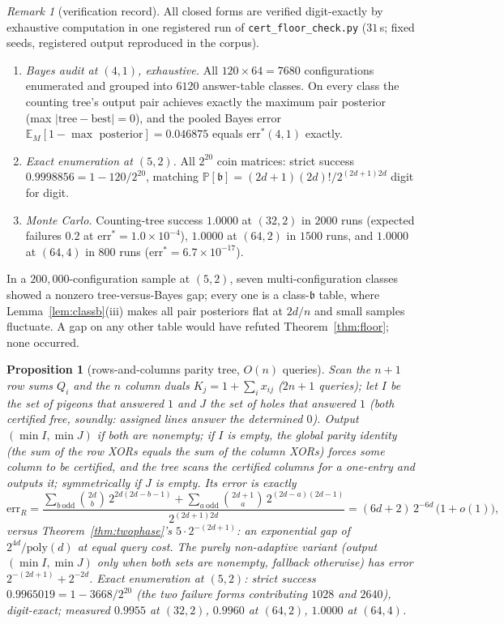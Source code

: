 \documentclass[11pt]{article}
\newtheorem{proposition}[theorem]{Proposition}
\theoremstyle{definition}
\theoremstyle{remark}
\newtheorem{remark}[theorem]{Remark}
\newcommand{\Prob}{\mathbb{P}}
\begin{document}
\begin{remark}[verification record]\label{rem:floorverify}
All closed forms are verified digit-exactly by exhaustive computation
in one registered run of \texttt{cert\_floor\_check.py} ($31$\,s; fixed
seeds, registered output reproduced in the corpus).
\begin{enumerate}
\item \emph{Bayes audit at $(4,1)$, exhaustive.}  All
$120\times64=7680$ configurations enumerated and grouped into $6120$
answer-table classes.  On every class the counting tree's output pair
achieves exactly the maximum pair posterior (max
$\lvert\text{tree}-\text{best}\rvert=0$), and the pooled Bayes error
$\mathbb{E}_M[1-\max\text{ posterior}]=0.046875$ equals
$\mathrm{err}^*(4,1)$ exactly.
\item \emph{Exact enumeration at $(5,2)$.}  All $2^{20}$ coin
matrices: strict success $0.9998856=1-120/2^{20}$, matching
$\Prob[\mathfrak{b}]=(2d+1)(2d)!/2^{(2d+1)2d}$ digit for digit.
\item \emph{Monte Carlo.}  Counting-tree success $1.0000$ at $(32,2)$
in $2000$ runs (expected failures $0.2$ at
$\mathrm{err}^*=1.0\times10^{-4}$), $1.0000$ at $(64,2)$ in $1500$
runs, and $1.0000$ at $(64,4)$ in $800$ runs
($\mathrm{err}^*=6.7\times10^{-17}$).
\end{enumerate}
In a $200{,}000$-configuration sample at $(5,2)$, seven
multi-configuration classes showed a nonzero tree-versus-Bayes gap;
every one is a class-$\mathfrak{b}$ table, where
Lemma~\ref{lem:classb}(iii) makes all pair posteriors flat at $2d/n$
and small samples fluctuate.  A gap on any other table would have
refuted Theorem~\ref{thm:floor}; none occurred.
\end{remark}

\begin{proposition}[rows-and-columns parity tree, $O(n)$ queries]
\label{prop:rcparity}
Scan the $n+1$ row sums $Q_i$ and the $n$ column duals
$K_j=1+\sum_ix_{ij}$ ($2n+1$ queries); let $I$ be the set of pigeons
that answered $1$ and $J$ the set of holes that answered $1$ (both
certified free, soundly: assigned lines answer the determined $0$).
Output $(\min I,\min J)$ if both are nonempty; if $I$ is empty, the
global parity identity (the sum of the row XORs equals the sum of the
column XORs) forces some column to be certified, and the tree scans
the certified columns for a one-entry and outputs it; symmetrically if
$J$ is empty.  Its error is exactly
\[
\mathrm{err}_{R}
=\frac{\displaystyle\sum_{b\ \mathrm{odd}}\binom{2d}{b}\,
2^{2d(2d-b-1)}
+\sum_{a\ \mathrm{odd}}\binom{2d+1}{a}\,
2^{(2d-a)(2d-1)}}{2^{(2d+1)2d}}
=(6d+2)\,2^{-6d}\,\bigl(1+o(1)\bigr),
\]
versus Theorem~\ref{thm:twophase}'s $5\cdot 2^{-(2d+1)}$: an
exponential gap of $2^{4d}/\mathrm{poly}(d)$ at equal query cost.  The
purely non-adaptive variant (output $(\min I,\min J)$ only when both
sets are nonempty, fallback otherwise) has error $2^{-(2d+1)}+2^{-2d}$.
Exact enumeration at $(5,2)$: strict success
$0.9965019=1-3668/2^{20}$ (the two failure forms contributing $1028$
and $2640$), digit-exact; measured $0.9955$ at $(32,2)$, $0.9960$ at
$(64,2)$, $1.0000$ at $(64,4)$.
\end{proposition}
\end{document}
